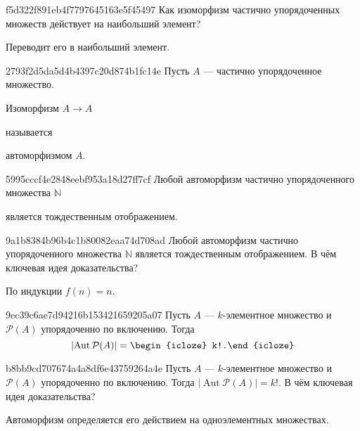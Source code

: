 \begin{note}{f5d322f891eb4f7797645163e5f45497}
    Как изоморфизм частично упорядоченных множеств действует на наибольший элемент?

    \begin{cloze}{1}
        Переводит его в наибольший элемент.
    \end{cloze}
\end{note}

\begin{note}{2793f2d5da5d4b4397c20d874b1fc14e}
    Пусть \({ A }\) --- частично упорядоченное множество.
    \begin{icloze}{2}Изоморфизм \({ A \to A }\)\end{icloze} называется \begin{icloze}{1}автоморфизмом \({ A }\).\end{icloze}
\end{note}

\begin{note}{5995cccf4e2848eebf953a18d27ff7cf}
    Любой автоморфизм частично упорядоченного множества \({ \mathbb N }\) \begin{icloze}{1}является тождественным отображением.\end{icloze}
\end{note}

\begin{note}{9a1b8384b96b4c1b80082eaa74d708ad}
    Любой автоморфизм частично упорядоченного множества \({ \mathbb N }\) является тождественным отображением.
    В чём ключевая идея доказательства?

    \begin{cloze}{1}
        По индукции \({ f(n) = n }\).
    \end{cloze}
\end{note}

\begin{note}{9ec39c6ae7d94216b153421659205a07}
    Пусть \({ A }\) --- \({ k }\)-элементное множество и \({ \mathcal P(A) }\) упорядоченно по включению.
    Тогда
    \[
        \left\lvert \operatorname{Aut} \mathcal P(A) \right\rvert = \begin{icloze}{1}k!.\end{icloze}
    \]
\end{note}

\begin{note}{b8bb9cd707674a4a8df6e43759264a4e}
    Пусть \({ A }\) --- \({ k }\)-элементное множество и \({ \mathcal P(A) }\) упорядоченно по включению.
    Тогда \({ \left\lvert \operatorname{Aut} \mathcal P(A) \right\rvert = k! }\).
    В чём ключевая идея доказательства?

    \begin{cloze}{1}
        Автоморфизм определяется его действием на одно\-э\-ле\-мен\-тных множествах.
    \end{cloze}
\end{note}

